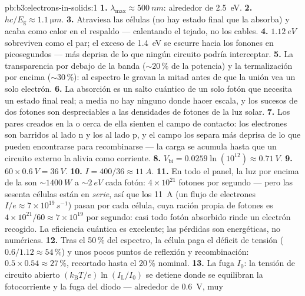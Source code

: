 \begin{solution}{pb:b3:electrons-in-solids:1}
\textbf{1.} $\lambda_{\text{max}} \approx \qty{500}{nm}$:
alrededor de \qty{2.5}{eV}.
\textbf{2.} $hc/E_{\text{g}} \approx \qty{1.1}{\micro m}$.
\textbf{3.} Atraviesa las células (no hay estado final que la
absorba) y acaba como calor en el respaldo --- calentando el tejado, no
los cables.
\textbf{4.} $\qty{1.12}{eV}$ sobreviven como el par; el exceso de
\qty{1.4}{eV} se escurre hacia los fonones en picosegundos --- más deprisa
de lo que ningún circuito podría interceptar.
\textbf{5.} La transparencia por debajo de la banda ($\sim20\,\%$ de la potencia) y
la termalización por encima ($\sim30\,\%$): al espectro le gravan
la mitad antes de que la unión vea un solo electrón.
\textbf{6.} La absorción es un salto cuántico de un solo fotón que necesita un
estado final real; a media  no hay ninguno donde hacer escala, y
los sucesos de dos fotones son despreciables a las densidades de fotones de la luz solar.
\textbf{7.} Los pares creados en la  o cerca de ella sienten el
campo de contacto: los electrones son barridos al lado n y los  al
lado p, y el campo los separa más deprisa de lo que pueden encontrarse
para recombinarse --- la carga se acumula hasta que un circuito
externo la alivia como corriente.
\textbf{8.} $V_{\text{bi}} = 0.0259\ln(10^{12}) \approx
\qty{0.71}{V}$.
\textbf{9.} $60\times\qty{0.6}{V} = \qty{36}{V}$.
\textbf{10.} $I = 400/36 \approx \qty{11}{A}$.
\textbf{11.} En todo el panel, la luz por encima de la  son
$\sim\qty{1400}{W}$ a $\sim\qty{2}{eV}$ cada fotón: $4\times10^{21}$
fotones por segundo --- pero las sesenta células están en \emph{serie},
así que los \qty{11}{A} (un flujo de electrones $I/e \approx
7\times10^{19}\,\unit{s^{-1}}$) pasan por cada célula, cuya
ración propia de fotones es $4\times10^{21}/60 \approx
7\times10^{19}$ por segundo: casi todo fotón absorbido rinde
un electrón recogido. La eficiencia cuántica es excelente; las
pérdidas son energéticas, no numéricas.
\textbf{12.} Tras el 50\,\% del espectro, la célula paga el
déficit de tensión ($0.6/1.12 \approx 54\,\%$) y unos pocos puntos de
reflexión y recombinación: $0.5\times0.54 \approx 27\,\%$,
recortado hasta el 20\,\% nominal.
\textbf{13.} La fuga $I_0$: la tensión de circuito abierto
$(k_{\text{B}}T/e)\ln(I_{\text{L}}/I_0)$ se detiene donde
se equilibran la fotocorriente y la fuga del diodo --- alrededor de \qty{0.6}{V}, muy

\end{solution}
